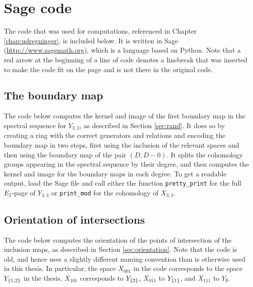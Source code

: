 
\chapter{Sage code} 
\label{appendix:sage}

The code that was used for computations, referenced in Chapter
\ref{chap:udregninger}, is included below. It is written in Sage 
(\url{http://www.sagemath.org}),
which is a language based on Python. Note that a red arrow at
the beginning of a line of code denotes a linebreak that was inserted
to make the code fit on the page and is not there in the original
code.

\section{The boundary map}
\label{sec:sageboundary}

The code below computes the kernel and image of the first boundary map
in the spectral sequence for $Y_{3,3}$, as described in Section
\ref{sec:rand}. It does so by creating a ring with the correct
generators and relations and encoding the boundary map in two steps,
first using the inclusion of the relevant spaces and then using the
boundary map of the pair $(D,D-0)$. It splits the cohomology
groups appearing in the spectral sequence by their degree, and then
computes 
the kernel and image for the boundary maps in each degree. To get a
readable output, load the
Sage file and call either the function \lstinline{pretty_print} for
the full $E_2$-page of $Y_{3,3}$ or \lstinline{print_mod} for the
cohomology of $X_{3,3}$.




\section{Orientation of intersections}
\label{sec:sageorientation}

The code below computes the orientation of the points of intersection
of the inclusion maps, as described in Section
\ref{sec:orientation}. Note that the code is old, and hence uses a
slightly different naming convention than is otherwise used in this
thesis. In particular, the space $X_{001}$ in the code corresponds to
the space $Y_{\left\{ 1,2 \right\}}$ in the thesis, $X_{101}$ corresponds to
$Y_{\left\{ 2 \right\}}$, $X_{011}$ to $Y_{\left\{ 1 \right\}}$, and $X_{111}$ to
$Y_{\emptyset}$.




